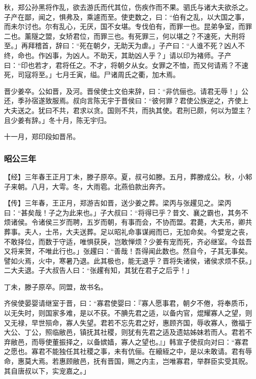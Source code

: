 \documentclass[]{article}
\begin{document}
秋，郑公孙黑将作乱，欲去游氏而代其位，伤疾作而不果。驷氏与诸大夫欲杀之。子产在鄙，闻之，惧弗及，乘遽而至。使吏数之，曰：``伯有之乱，以大国之事，而未尔讨也。尔有乱心，无厌，国不女堪。专伐伯有，而罪一也。昆弟争室，而罪二也。薰隧之盟，女矫君位，而罪三也。有死罪三，何以堪之？不速死，大刑将至。」再拜稽首，辞曰：``死在朝夕，无助天为虐。」子产曰：``人谁不死？凶人不终，命也。作凶事，为凶人。不助天，其助凶人乎？」请以印为褚师。子产曰：``印也若才，君将任之。不才，将朝夕从女。女罪之不恤，而又何请焉？不速死，司寇将至。」七月壬寅，缢。尸诸周氏之衢，加木焉。

晋少姜卒。公如晋，及河。晋侯使士文伯来辞，曰：``非伉俪也。请君无辱！」公还，季孙宿遂致服焉。叔向言陈无宇于晋侯曰：``彼何罪？君使公族逆之，齐使上大夫送之。犹曰不共，君求以贪。国则不共，而执其使。君刑已颇，何以为盟主？且少姜有辞。」冬十月，陈无宇归。

十一月，郑印段如晋吊。

\hypertarget{header-n2397}{%
\subsubsection{昭公三年}\label{header-n2397}}

【经】三年春王正月丁未，滕子原卒。夏，叔弓如滕。五月，葬滕成公。秋，小邾子来朝。八月，大雩。冬，大雨雹。北燕伯款出奔齐。

【传】三年春，王正月，郑游吉如晋，送少姜之葬。梁丙与张趯见之。梁丙曰：``甚矣哉！子之为此来也。」子大叔曰：``将得已乎？昔文、襄之霸也，其务不烦诸侯。令诸侯三岁而聘，五岁而朝，有事而会，不协而盟。君薨，大夫吊，卿共葬事。夫人，士吊，大夫送葬。足以昭礼命事谋阙而已，无加命矣。今嬖宠之丧，不敢择位，而数于守适，唯惧获戾，岂敢惮烦？少姜有宠而死，齐必继室。今兹吾又将来贺，不唯此行也。」张趯曰：``善哉！吾得闻此数也。然自今，子其无事矣。譬如火焉，火中，寒暑乃退。此其极也，能无退乎？晋将失诸侯，诸侯求烦不获。」二大夫退。子大叔告人曰：``张趯有知，其犹在君子之后乎！」

丁未，滕子原卒。同盟，故书名。

齐侯使晏婴请继室于晋，曰：``寡君使婴曰：『寡人愿事君，朝夕不倦，将奉质币，以无失时，则国家多难，是以不获。不腆先君之适，以备内官，焜耀寡人之望，则又无禄，早世殒命，寡人失望。君若不忘先君之好，惠顾齐国，辱收寡人，徼福于大公、丁公，照临敝邑，镇抚其社稷，则犹有先君之适及遗姑姊妹若而人。君若不弃敝邑，而辱使董振择之，以备嫔嫱，寡人之望也。』」韩宣子使叔向对曰：``寡君之愿也。寡君不能独任其社稷之事，未有伉俪。在縗絰之中，是以未敢请。君有辱命，惠莫大焉。若惠顾敝邑，抚有晋国，赐之内主，岂唯寡君，举群臣实受其贶。其自唐叔以下，实宠嘉之。」
\end{document}

